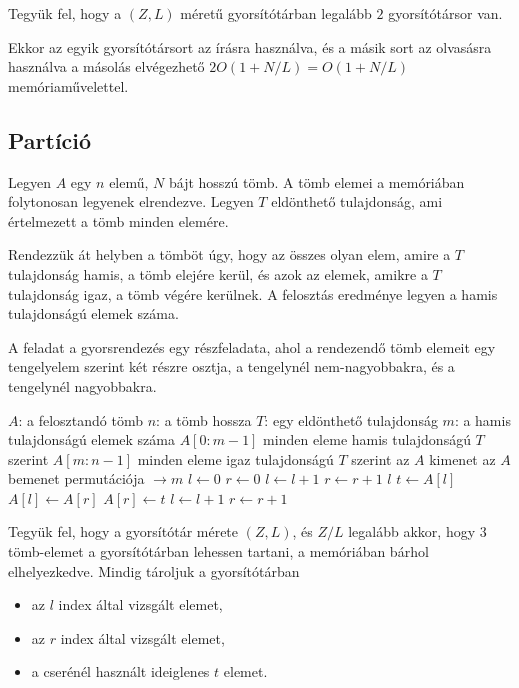 \documentclass[12pt]{report}
\begin{document}
Tegyük fel, hogy a $(Z, L)$ méretű gyorsítótárban
legalább $2$ gyorsítótársor van.

Ekkor az egyik gyorsítótársort az írásra használva,
és a másik sort az olvasásra használva a másolás elvégezhető
$2O(1+N/L)=O(1+N/L)$ memóriaművelettel.

\subsection{Partíció}

Legyen $A$ egy $n$ elemű, $N$ bájt hosszú tömb.
A tömb elemei a memóriában folytonosan legyenek elrendezve.
Legyen $T$ eldönthető tulajdonság,
ami értelmezett a tömb minden elemére.

Rendezzük át helyben a tömböt úgy,
hogy az összes olyan elem, amire a $T$ tulajdonság hamis,
a tömb elejére kerül,
és azok az elemek, amikre a $T$ tulajdonság igaz,
a tömb végére kerülnek.
A felosztás eredménye legyen a hamis tulajdonságú elemek száma.

A feladat a gyorsrendezés egy részfeladata,
ahol a rendezendő tömb elemeit egy tengelyelem szerint
két részre osztja,
a tengelynél nem-nagyobbakra, és a tengelynél nagyobbakra.
\cite{algoritmusok}

\begin{algorithm}
\caption{Az $A[0:n-1]$ tömb felosztása a $T$ tulajdonság szerint}
\label{alg:partition}
\begin{algorithmic}[1]
\Require $A$: a felosztandó tömb
\Require $n$: a tömb hossza
\Require $T$: egy eldönthető tulajdonság
\Ensure $m$: a hamis tulajdonságú elemek száma
\Ensure $A[0:m-1]$ minden eleme hamis tulajdonságú $T$ szerint
\Ensure $A[m:n-1]$ minden eleme igaz tulajdonságú $T$ szerint
\Ensure az $A$ kimenet az $A$ bemenet permutációja
 $\rightarrow m$
	\State $l \leftarrow 0$
	\State $r \leftarrow 0$
			\State $l \leftarrow l+1$
		\EndWhile
			\State $r \leftarrow r+1$
		\EndWhile
			\State \Return $l$
		\EndIf
		\State $t \leftarrow A[l]$
		\State $A[l] \leftarrow A[r]$
		\State $A[r] \leftarrow t$
		\State $l \leftarrow l+1$
		\State $r \leftarrow r+1$
	\EndWhile
\EndFunction
\end{algorithmic}
\end{algorithm}

Tegyük fel, hogy a gyorsítótár mérete $(Z, L)$,
és $Z/L$ legalább akkor, hogy $3$ tömb-elemet a gyorsítótárban lehessen tartani,
a memóriában bárhol elhelyezkedve. Mindig tároljuk a gyorsítótárban
\begin{itemize}
\item az $l$ index által vizsgált elemet,
\item az $r$ index által vizsgált elemet,
\item a cserénél használt ideiglenes $t$ elemet.
\end{itemize}
\end{document}
